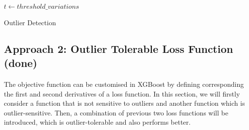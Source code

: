 \documentclass[runningheads]{llncs}
\begin{document}
\begin{algorithm}[H]
\SetAlgoLined

 \STATE $t\gets threshold\_variations$
 
 
 \While{$t\neq empty$}{
  \STATE $outlier\_fraction\gets t.head(1)$
  
  \STATE $classifiers\gets \{ \\
     abod: angle\_based\_outlier\_detection \\
     cblof: cluseter\_based\_outlier\_detection \\
        ... \\
  \}$
  
  \For{$cls\_name, $cls\_object in classifiers$ $}    {
      
       
          
          \STATE $X\_train \gets dataset$ \\
          \STATE $cls\_object.fit(X\_train)$
          
          \STATE  $scores\_pred \gets cls\_object.decision\_function(X\_train)*-1$ \\
          \STATE $y\_pred \gets cls\_object.predict(X\_train)$
          
          \STATE $outliers \gets scores\_pred.head(outlier\_fraction)$
          
          \STATE $dataset\_new \gets X\_train.drop(outliers)$
          
          \STATE $result \gets crossValidate(dataset\_new, parameters)$
          
          \STATE $y\_pred \gets xgboost.predict(dataset\_new)$
   }                
   \EndFor
 }
 \caption{Outlier Detection}
\end{algorithm}



\subsection{Approach 2: Outlier Tolerable Loss Function (done)}

\paragraph{} The objective function can be customised in XGBoost by defining corresponding the first and second derivatives of a loss function. In this section, we will firstly consider a function that is not sensitive to outliers and another function which is outlier-sensitive. Then, a combination of previous two loss functions will be introduced, which is outlier-tolerable and also performs better.
\end{document}
